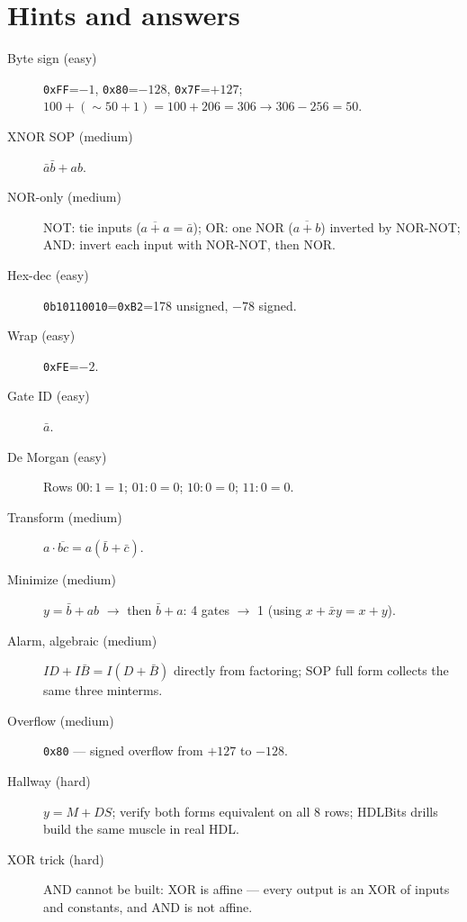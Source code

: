 \section*{Hints and answers}
\begin{description}
\item[Byte sign (easy)] \texttt{0xFF}=$-1$, \texttt{0x80}=$-128$,
\texttt{0x7F}=$+127$; $100+(\sim50+1)=100+206=306\to306-256=50$.
\item[XNOR SOP (medium)] $\bar a\bar b + ab$.
\item[NOR-only (medium)] NOT: tie inputs ($\overline{a+a}=\bar a$);
OR: one NOR ($\overline{a+b}$) inverted by NOR-NOT; AND: invert each
input with NOR-NOT, then NOR.
\item[Hex-dec (easy)] \texttt{0b10110010}=\texttt{0xB2}=178 unsigned,
$-78$ signed.
\item[Wrap (easy)] \texttt{0xFE}=$-2$.
\item[Gate ID (easy)] $\bar a$.
\item[De Morgan (easy)] Rows $00{:}1{=}1$; $01{:}0{=}0$; $10{:}0{=}0$;
$11{:}0{=}0$.
\item[Transform (medium)] $a\cdot\overline{bc}=a(\bar b+\bar c)$.
\item[Minimize (medium)] $y=\bar b+ab$ $\to$ then $\bar b+a$: 4 gates
$\to$ 1 (using $x+\bar xy=x+y$).
\item[Alarm, algebraic (medium)] $ID+I\bar B=I(D+\bar B)$ directly from
factoring; SOP full form collects the same three minterms.
\item[Overflow (medium)] \texttt{0x80} — signed overflow from $+127$ to
$-128$.
\item[Hallway (hard)] $y=M+DS$; verify both forms equivalent on all 8
rows; HDLBits drills build the same muscle in real HDL.
\item[XOR trick (hard)] AND cannot be built: XOR is affine —
every output is an XOR of inputs and constants, and AND is not affine.
\end{description}
